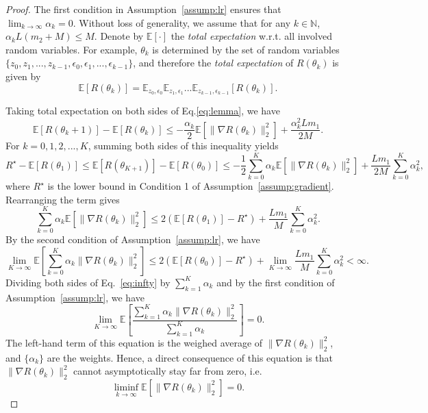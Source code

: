\documentclass{article}
\begin{document}
\begin{proof}
The first condition in Assumption~\ref{assump:lr} ensures that $\lim_{k\to\infty}\alpha_k=0$. Without loss of generality, we assume that for any $k\in\mathbb{N}$, $\alpha_k L(m_2+M) \leq M$. Denote by $\mathbb{E}[\cdot]$ the \emph{total expectation} w.r.t. all involved random variables. For example, $\theta_k$ is determined by the set of random variables $\{z_0, z_1,...,z_{k-1}, \epsilon_0, \epsilon_1,...,\epsilon_{k-1}\}$, and therefore the \emph{total expectation} of $R(\theta_k)$ is given by
\begin{equation}
    \mathbb{E}[R(\theta_k)]=\mathbb{E}_{z_0,\epsilon_0}\mathbb{E}_{z_1,\epsilon_1}...\mathbb{E}_{z_{k-1},\epsilon_{k-1}}[R(\theta_k)].
\end{equation}

Taking total expectation 
on both sides of Eq.\ref{eq:lemma}, we have
\begin{equation}
    \mathbb{E}[R(\theta_k+1)]-\mathbb{E}[R(\theta_k)] \leq -\frac{\alpha_k}{2}\mathbb{E}[\|\nabla R(\theta_k)\|_2^2] + \frac{\alpha_k^2L m_1}{2M}.
\end{equation}
For $k=0,1,2,...,K$, summing both sides of this inequality yields
\begin{equation}
    R^\star - \mathbb{E}[R(\theta_1)] \leq \mathbb{E}[R(\theta_{K+1})] - \mathbb{E}[R(\theta_{0})] \leq -\frac{1}{2}\sum_{k=0}^K\alpha_k\mathbb{E}[\|\nabla R(\theta_k)\|_2^2] + \frac{L m_1}{2M}\sum_{k=0}^K \alpha_k^2,
\end{equation}
where $R^\star$ is the lower bound in Condition 1 of Assumption~\ref{assump:gradient}. Rearranging the term gives
\begin{equation}
    \sum_{k=0}^K\alpha_k\mathbb{E}[\|\nabla R(\theta_k)\|_2^2] \leq 2(\mathbb{E}[R(\theta_1)]-R^\star) + \frac{L m_1}{M}\sum_{k=0}^K \alpha_k^2.
\end{equation}
By the second condition of Assumption~\ref{assump:lr}, we have
\begin{equation}\label{eq:infty}
    \lim_{K\to\infty}\mathbb{E}[\sum_{k=0}^K\alpha_k\|\nabla R(\theta_k)\|_2^2] \leq 2(\mathbb{E}[R(\theta_0)]-R^\star) + \lim_{K\to\infty}\frac{L m_1}{M}\sum_{k=0}^K \alpha_k^2 < \infty.
\end{equation}
Dividing both sides of Eq.~\ref{eq:infty} by $\sum_{k=1}^K\alpha_k$ and by the first condition of Assumption~\ref{assump:lr}, we have
\begin{equation}
    \lim_{K\to\infty}\mathbb{E}[\frac{\sum_{k=1}^K\alpha_k\|\nabla R(\theta_k)\|_2^2}{\sum_{k=1}^K\alpha_k}] = 0.
\end{equation}
The left-hand term of this equation is the weighed average of $\|\nabla R(\theta_k)\|_2^2$, and $\{\alpha_k\}$ are the weights. Hence, a direct consequence of this equation is that $\|\nabla R(\theta_k)\|_2^2$ cannot asymptotically stay far from zero, i.e.
\begin{equation}\label{eq:liminf}
    \liminf_{k\to\infty}\mathbb{E}[\|\nabla R(\theta_k)\|_2^2]=0.
\end{equation}
\end{proof}
\end{document}
